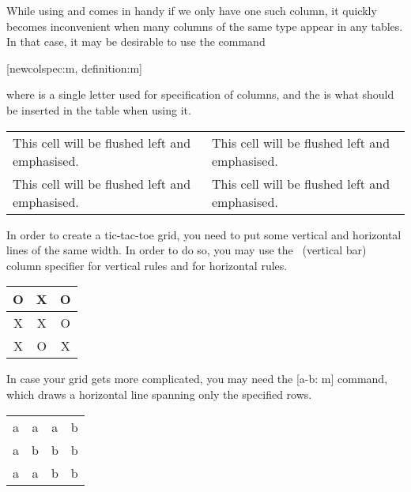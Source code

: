 While using  and  comes in handy if we only have
one such column, it quickly becomes inconvenient when many columns of the same
type appear in any tables. In that case, it may be desirable to use the command
\begin{lscommand}
  [newcolspec:m, definition:m]
\end{lscommand}
where  is a single letter used for specification of columns,
and the  is what should be inserted in the table when using
it.
\begin{example}
\begin{tabular}{ee}
  This cell will
    be flushed left
    and emphasised. &
  This cell will
    be flushed left
    and emphasised.
  \tabularnewline

  This cell will
    be flushed left
    and emphasised. &
  This cell will
    be flushed left
    and emphasised.
  \tabularnewline
\end{tabular}
\end{example}

In order to create a tic-tac-toe grid, you need to put some vertical and
horizontal lines of the same width. In order to do so, you may use the
\cargv{|}~(vertical bar) column specifier for vertical rules and  for
horizontal rules.
\begin{chktexignore}
  \begin{example}
\begin{tabular}{c|c|c}
  O & X & O \\
  \hline
  X & X & O \\
  \hline
  X & O & X \\
\end{tabular}
\end{example}
\end{chktexignore}
In case your grid gets more complicated, you may need the [a-b: m] %
command, which draws a horizontal line spanning only the specified rows.
\begin{chktexignore}
  \begin{example}[examplewidth=0.35\linewidth]
\begin{tabular}{|cccc|}
  \cline{4-4}
  a & a & \multicolumn{1}{c|}{a} & b \\
  \cline{2-3}
  a & \multicolumn{1}{|c}{b} & b & b \\
  \cline{2-2}
  a & a & \multicolumn{1}{|c}{b} & b \\
  \cline{1-2}
\end{tabular}
\end{example}
\end{chktexignore}


